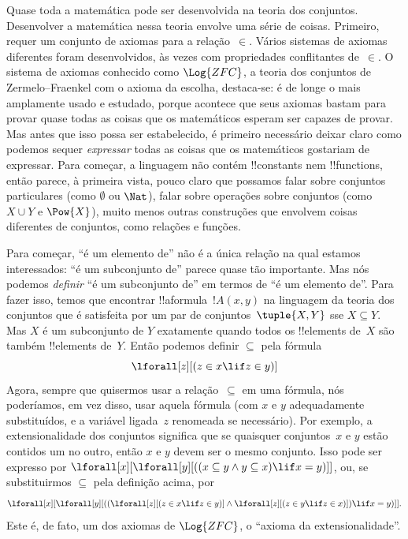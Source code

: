 \documentclass[../../../include/open-logic-section]{subfiles}
\begin{document}


Quase toda a matemática pode ser desenvolvida na teoria dos conjuntos.
Desenvolver a matemática nessa teoria envolve uma série de coisas.
Primeiro, requer um conjunto de axiomas para a relação~$\in$.  Vários
sistemas de axiomas diferentes foram desenvolvidos, às vezes com
propriedades conflitantes de~$\in$.  O sistema de axiomas conhecido como
$\Log{ZFC}$, a teoria dos conjuntos de Zermelo--Fraenkel com o axioma da escolha,
destaca-se: é de longe o mais amplamente usado e estudado, porque
acontece que seus axiomas bastam para provar quase todas as coisas
que os matemáticos esperam ser capazes de provar.  Mas antes que isso possa ser
estabelecido, é primeiro necessário deixar claro como podemos sequer
\emph{expressar} todas as coisas que os matemáticos gostariam de expressar.
Para começar, a linguagem não contém !!{constant}s nem !!{function}s,
então parece, à primeira vista, pouco claro que possamos falar sobre conjuntos
particulares (como $\emptyset$ ou $\Nat$), falar sobre operações sobre
conjuntos (como $X \cup Y$ e $\Pow{X}$), muito menos outras
construções que envolvem coisas diferentes de conjuntos, como relações
e funções.

Para começar, ``é um elemento de'' não é a única relação na qual estamos
interessados: ``é um subconjunto de'' parece quase tão importante.  Mas nós
podemos \emph{definir} ``é um subconjunto de'' em termos de ``é um elemento de''.
Para fazer isso, temos que encontrar !!a{formula}~$!A(x, y)$ na
linguagem da teoria dos conjuntos que é satisfeita por um par de
conjuntos~$\tuple{X, Y}$ sse $X \subseteq Y$.  Mas $X$ é um subconjunto de $Y$
exatamente quando todos os !!{element}s de~$X$ são também !!{element}s de~$Y$.  Então
podemos definir $\subseteq$ pela fórmula
\[
\lforall[z][(z \in x \lif z \in y)]
\]
Agora, sempre que quisermos usar a relação~$\subseteq$ em uma fórmula, nós
poderíamos, em vez disso, usar aquela fórmula (com $x$ e $y$ adequadamente substituídos,
e a variável ligada~$z$ renomeada se necessário).  Por exemplo,
a extensionalidade dos conjuntos significa que se quaisquer conjuntos~$x$ e $y$ estão
contidos um no outro, então $x$ e $y$ devem ser o mesmo conjunto. Isso
pode ser expresso por $\lforall[x][\lforall[y][((x \subseteq y \land y
    \subseteq x) \lif x = y)]]$, ou, se substituirmos $\subseteq$ pela
definição acima, por
\[
\lforall[x][\lforall[y][((\lforall[z][(z \in x \lif z \in y)] \land
    \lforall[z][(z \in y \lif z \in x)]) \lif x = y)]].
\]
Este é, de fato, um dos axiomas de $\Log{ZFC}$, o ``axioma da
extensionalidade''.
\end{document}
